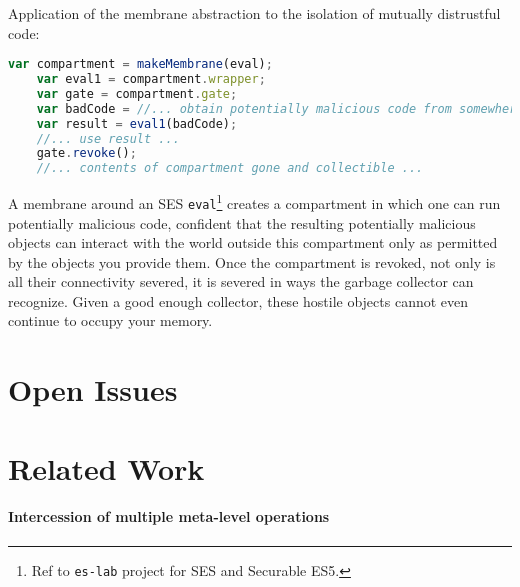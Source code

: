 \documentclass[10pt,legalpaper]{article}
\begin{document}
Application of the membrane abstraction to the isolation of mutually distrustful code:

\begin{lstlisting}[language=javascript]
    var compartment = makeMembrane(eval);
    var eval1 = compartment.wrapper;
    var gate = compartment.gate;
    var badCode = //... obtain potentially malicious code from somewhere ...
    var result = eval1(badCode);
    //... use result ...
    gate.revoke();
    //... contents of compartment gone and collectible ...
\end{lstlisting}

A membrane around an SES \texttt{eval}\footnote{Ref to \texttt{es-lab} project for SES and Securable ES5.} creates a compartment in which one can run potentially malicious code, confident that the resulting potentially malicious objects can interact with the world outside this compartment only as permitted by the objects you provide them. Once the compartment is revoked, not only is all their connectivity severed, it is severed in ways the garbage collector can recognize. Given a good enough collector, these hostile objects cannot even continue to occupy your memory.

\section{Open Issues}

\section{Related Work}

\paragraph{Intercession of multiple meta-level operations}


\end{document}

